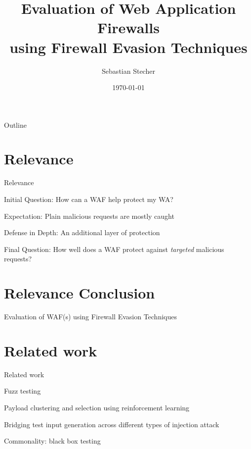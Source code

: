 \documentclass[aspectratio=169]{beamer}
\title[Evaluation of Web Application Firewalls using Firewall Evasion Techniques]{Evaluation of Web Application Firewalls \\ using Firewall Evasion Techniques}
\author{Sebastian Stecher}
\institute{HDBW Hochschule der Bayerischen Wirtschaft}
\date{\today}
\newcommand{\supertext}[1]{\fontsize{30}{40}\selectfont #1}
\begin{document}
\maketitle



\begin{frame}{Outline}
	\tableofcontents
\end{frame}

\section{Relevance}
\begin{frame}{Relevance}
	\begin{vfilleditems}
		\item<2-> Initial Question: How can a WAF help protect my WA?
		\item<3-> Expectation: Plain malicious requests are mostly caught
		\item<4-> Defense in Depth: An additional layer of protection
		\item<5-> Final Question: How well does a WAF protect against \textit{targeted} malicious requests?
	\end{vfilleditems}
\end{frame}

\section*{Relevance Conclusion}
\begin{frame}
	\centering
	\vfill
	\supertext{Evaluation of WAF(s) using Firewall Evasion Techniques}
	\vfill
\end{frame}

\section{Related work}
\begin{frame}[fragile]{Related work}
	\begin{vfilleditems}
		\item<2-> Fuzz testing \cite{rw/demetrio}
		\item<3-> Payload clustering and selection using reinforcement learning \cite{rw/mohammad}
		\item<4-> Bridging test input generation across different
		types of injection attack \cite{rw/derLI}
		\item<5-> Commonality: black box testing
	\end{vfilleditems}
\end{frame}
\end{document}
